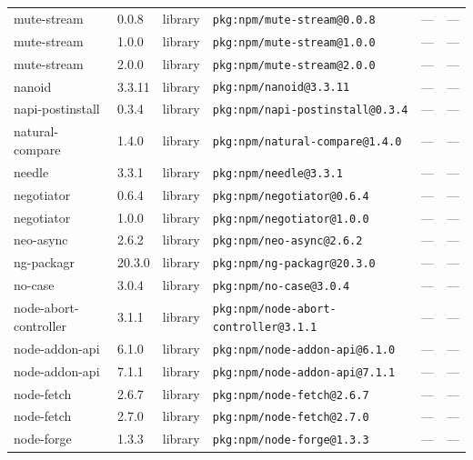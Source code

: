 \documentclass[11pt,a4paper]{article}
\begin{document}
\begin{longtable}{|p{4cm}|p{2cm}|p{1.6cm}|p{5cm}|p{1.5cm}|p{3.5cm}|}
\raggedright mute-stream & 0.0.8 & library & \small\texttt{pkg:npm/mute-stream@0.0.8} & — & \small — \\
\raggedright mute-stream & 1.0.0 & library & \small\texttt{pkg:npm/mute-stream@1.0.0} & — & \small — \\
\raggedright mute-stream & 2.0.0 & library & \small\texttt{pkg:npm/mute-stream@2.0.0} & — & \small — \\
\raggedright nanoid & 3.3.11 & library & \small\texttt{pkg:npm/nanoid@3.3.11} & — & \small — \\
\raggedright napi-postinstall & 0.3.4 & library & \small\texttt{pkg:npm/napi-postinstall@0.3.4} & — & \small — \\
\raggedright natural-compare & 1.4.0 & library & \small\texttt{pkg:npm/natural-compare@1.4.0} & — & \small — \\
\raggedright needle & 3.3.1 & library & \small\texttt{pkg:npm/needle@3.3.1} & — & \small — \\
\raggedright negotiator & 0.6.4 & library & \small\texttt{pkg:npm/negotiator@0.6.4} & — & \small — \\
\raggedright negotiator & 1.0.0 & library & \small\texttt{pkg:npm/negotiator@1.0.0} & — & \small — \\
\raggedright neo-async & 2.6.2 & library & \small\texttt{pkg:npm/neo-async@2.6.2} & — & \small — \\
\raggedright ng-packagr & 20.3.0 & library & \small\texttt{pkg:npm/ng-packagr@20.3.0} & — & \small — \\
\raggedright no-case & 3.0.4 & library & \small\texttt{pkg:npm/no-case@3.0.4} & — & \small — \\
\raggedright node-abort-controller & 3.1.1 & library & \small\texttt{pkg:npm/node-abort-controller@3.1.1} & — & \small — \\
\raggedright node-addon-api & 6.1.0 & library & \small\texttt{pkg:npm/node-addon-api@6.1.0} & — & \small — \\
\raggedright node-addon-api & 7.1.1 & library & \small\texttt{pkg:npm/node-addon-api@7.1.1} & — & \small — \\
\raggedright node-fetch & 2.6.7 & library & \small\texttt{pkg:npm/node-fetch@2.6.7} & — & \small — \\
\raggedright node-fetch & 2.7.0 & library & \small\texttt{pkg:npm/node-fetch@2.7.0} & — & \small — \\
\raggedright node-forge & 1.3.3 & library & \small\texttt{pkg:npm/node-forge@1.3.3} & — & \small — \\

\end{longtable}
\end{document}

